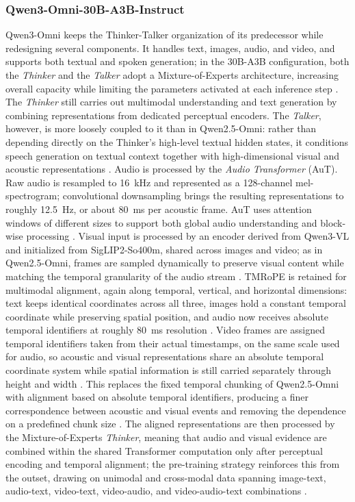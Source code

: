 \subsubsection*{Qwen3-Omni-30B-A3B-Instruct}
Qwen3-Omni keeps the Thinker-Talker organization of its predecessor while redesigning several components. It handles text, images, audio, and video, and supports both textual and spoken generation; in the 30B-A3B configuration, both the \textit{Thinker} and the \textit{Talker} adopt a Mixture-of-Experts architecture, increasing overall capacity while limiting the parameters activated at each inference step \cite{qwen3omni}.
The \textit{Thinker} still carries out multimodal understanding and text generation by combining representations from dedicated perceptual encoders. The \textit{Talker}, however, is more loosely coupled to it than in Qwen2.5-Omni: rather than depending directly on the Thinker's high-level textual hidden states, it conditions speech generation on textual context together with high-dimensional visual and acoustic representations \cite{qwen3omni}.
Audio is processed by the \textit{Audio Transformer} (AuT). Raw audio is resampled to 16~kHz and represented as a 128-channel mel-spectrogram; convolutional downsampling brings the resulting representations to roughly 12.5~Hz, or about 80~ms per acoustic frame. AuT uses attention windows of different sizes to support both global audio understanding and block-wise processing \cite{qwen3omni}.
Visual input is processed by an encoder derived from Qwen3-VL and initialized from SigLIP2-So400m, shared across images and video; as in Qwen2.5-Omni, frames are sampled dynamically to preserve visual content while matching the temporal granularity of the audio stream \cite{qwen3omni}.
TMRoPE is retained for multimodal alignment, again along temporal, vertical, and horizontal dimensions: text keeps identical coordinates across all three, images hold a constant temporal coordinate while preserving spatial position, and audio now receives absolute temporal identifiers at roughly 80~ms resolution \cite{qwen3omni}. Video frames are assigned temporal identifiers taken from their actual timestamps, on the same scale used for audio, so acoustic and visual representations share an absolute temporal coordinate system while spatial information is still carried separately through height and width \cite{qwen3omni}.
This replaces the fixed temporal chunking of Qwen2.5-Omni with alignment based on absolute temporal identifiers, producing a finer correspondence between acoustic and visual events and removing the dependence on a predefined chunk size \cite{qwen3omni}. The aligned representations are then processed by the Mixture-of-Experts \textit{Thinker}, meaning that audio and visual evidence are combined within the shared Transformer computation only after perceptual encoding and temporal alignment; the pre-training strategy reinforces this from the outset, drawing on unimodal and cross-modal data spanning image-text, audio-text, video-text, video-audio, and video-audio-text combinations \cite{qwen3omni}.

